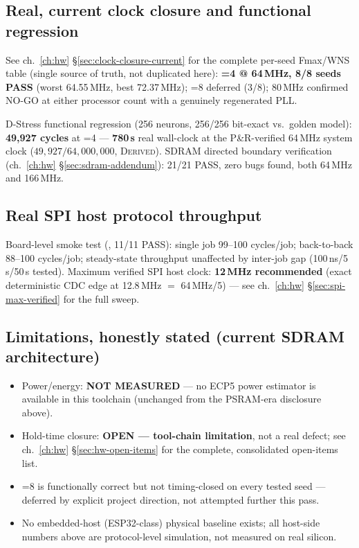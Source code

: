 \subsection{Real, current clock closure and functional regression}
See ch.~\ref{ch:hw} \S\ref{sec:clock-closure-current} for the complete
per-seed Fmax/WNS table (single source of truth, not duplicated here):
\textbf{=4 @ 64\,MHz, 8/8 seeds PASS} (worst 64.55\,MHz,
best 72.37\,MHz); =8 deferred (3/8); 80\,MHz confirmed
NO-GO at either processor count with a genuinely regenerated PLL.

D-Stress functional regression (256 neurons, 256/256 bit-exact vs.\
golden model): \textbf{49,927 cycles} at =4 ---
\textbf{780\,\textmu s} real wall-clock at the P\&R-verified 64\,MHz
system clock ($49{,}927 / 64{,}000{,}000$, \textsc{Derived}). SDRAM
directed boundary verification (ch.~\ref{ch:hw}
\S\ref{sec:sdram-addendum}): 21/21 PASS, zero bugs found, both 64\,MHz
and 166\,MHz.

\subsection{Real SPI host protocol throughput}
Board-level smoke test (, 11/11
PASS): single job 99--100 cycles/job; back-to-back 88--100 cycles/job;
steady-state throughput unaffected by inter-job gap (100\,ns/5\,\textmu
s/50\,\textmu s tested). Maximum verified SPI host clock: \textbf{12\,MHz
recommended} (exact deterministic CDC edge at 12.8\,MHz $=$ 64\,MHz/5)
--- see ch.~\ref{ch:hw} \S\ref{sec:spi-max-verified} for the full sweep.

\subsection{Limitations, honestly stated (current SDRAM architecture)}
\begin{itemize}
\item Power/energy: \textbf{NOT MEASURED} --- no ECP5 power estimator
      is available in this toolchain (unchanged from the PSRAM-era
      disclosure above).
\item Hold-time closure: \textbf{OPEN --- tool-chain limitation}, not a
      real defect; see ch.~\ref{ch:hw} \S\ref{sec:hw-open-items} for
      the complete, consolidated open-items list.
\item {}=8 is functionally correct but not
      timing-closed on every tested seed --- deferred by explicit
      project direction, not attempted further this pass.
\item No embedded-host (ESP32-class) physical baseline exists; all
      host-side numbers above are protocol-level simulation, not
      measured on real silicon.
\end{itemize}
